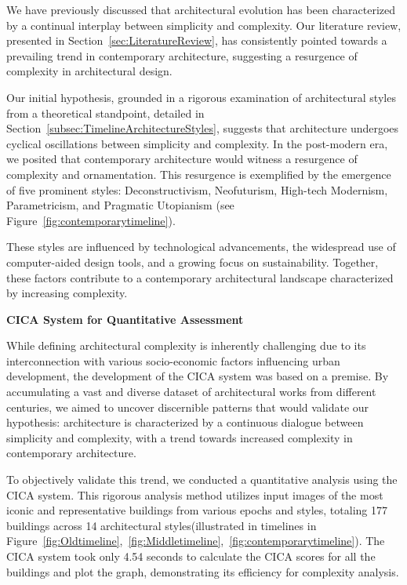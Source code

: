 %    

We have previously discussed that architectural evolution has been characterized by a continual interplay between simplicity and complexity.
Our literature review, presented in Section~\ref{sec:LiteratureReview}, has consistently pointed towards a prevailing trend in contemporary architecture, suggesting a resurgence of complexity in architectural design.

Our initial hypothesis, grounded in a rigorous examination of architectural styles from a theoretical standpoint, detailed in Section~\ref{subsec:TimelineArchitectureStyles}, suggests that architecture undergoes cyclical oscillations between simplicity and complexity.
In the post-modern era, we posited that contemporary architecture would witness a resurgence of complexity and ornamentation.
This resurgence is exemplified by the emergence of five prominent styles: Deconstructivism, Neofuturism, High-tech Modernism, Parametricism, and Pragmatic Utopianism (see Figure~\ref{fig:contemporarytimeline}).

These styles are influenced by technological advancements, the widespread use of computer-aided design tools, and a growing focus on sustainability.
Together, these factors contribute to a contemporary architectural landscape characterized by increasing complexity.

\textbf{CICA System for Quantitative Assessment}

While defining architectural complexity is inherently challenging due to its interconnection with various socio-economic factors influencing urban development, the development of the CICA system was based on a premise.
By accumulating a vast and diverse dataset of architectural works from different centuries, we aimed to uncover discernible patterns that would validate our hypothesis: architecture is characterized by a continuous dialogue between simplicity and complexity, with a trend towards increased complexity in contemporary architecture.

To objectively validate this trend, we conducted a quantitative analysis using the CICA system.
This rigorous analysis method utilizes input images of the most iconic and representative buildings from various epochs and styles, totaling 177 buildings across 14 architectural styles(illustrated in timelines in Figure~\ref{fig:Oldtimeline},~\ref{fig:Middletimeline},~\ref{fig:contemporarytimeline}).
The CICA system took only 4.54 seconds to calculate the CICA scores for all the buildings and plot the graph, demonstrating its efficiency for complexity analysis.

